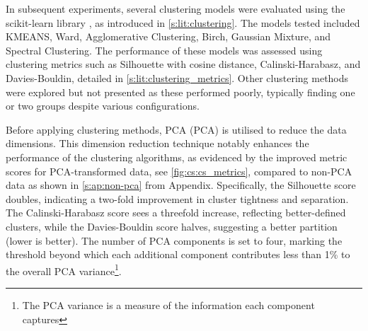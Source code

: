 In subsequent experiments, several clustering models were evaluated using the scikit-learn library \cite{Scikit-learn_undated-ax}, as introduced in \cref{s:lit:clustering}. The models tested included \gls{KMEANS}, Ward, Agglomerative Clustering, Birch, Gaussian Mixture, and Spectral Clustering. The performance of these models was assessed using clustering metrics such as Silhouette with cosine distance, Calinski-Harabasz, and Davies-Bouldin, detailed in \cref{s:lit:clustering_metrics}. Other clustering methods were explored but not presented as these performed poorly, typically finding one or two groups despite various configurations.


Before applying clustering methods, \gls{PCA} (PCA) is utilised to reduce the data dimensions. This dimension reduction technique notably enhances the performance of the clustering algorithms, as evidenced by the improved metric scores for PCA-transformed data, see  \cref{fig:cs:cs_metrics}, compared to non-PCA data as shown in \cref{s:ap:non-pca} from Appendix. Specifically, the Silhouette score doubles, indicating a two-fold improvement in cluster tightness and separation. The Calinski-Harabasz score sees a threefold increase, reflecting better-defined clusters, while the Davies-Bouldin score halves, suggesting a better partition (lower is better). The number of PCA components is set to four, marking the threshold beyond which each additional component contributes less than 1\% to the overall PCA variance\footnote{The PCA variance is a measure of the information each component captures}.

